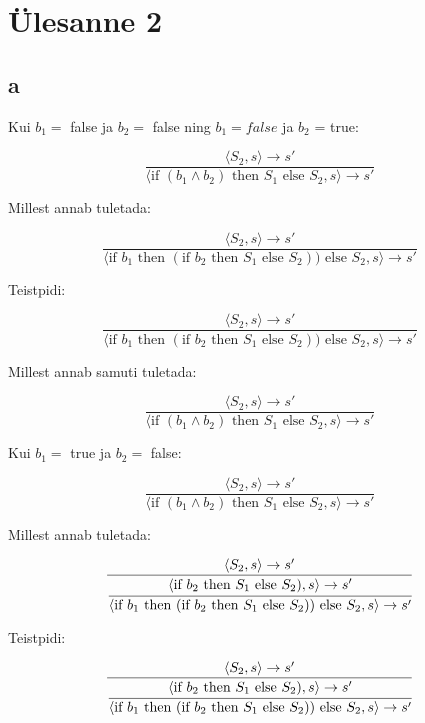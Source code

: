 \section{Ülesanne 2}

\subsection{a}

Kui \(b_1 = \) false ja \(b_2 =\) false ning \(b_1 = false\) ja \(b_2\)
= true:

\[
  \frac{
    \langle S_2, s \rangle \rightarrow s'
  }
  {
    \langle \text{if } (b_1 \wedge b_2) \text{ then } S_1 \text{ else }
    S_2, s \rangle \rightarrow s'
  }
\]

Millest annab tuletada:

\[
  \frac{
    \langle S_2, s \rangle \rightarrow s'
  }{
    \langle \text{if } b_1 \text{ then } (\text{if } b_2 \text{ then } S_1 \text{ else }
    S_2)) \text{ else } S_2, s \rangle \rightarrow s'
  }
\]

Teistpidi:

\[
  \frac{
    \langle S_2, s \rangle \rightarrow s'
  }{
    \langle \text{if } b_1 \text{ then } (\text{if } b_2 \text{ then } S_1 \text{ else }
    S_2)) \text{ else } S_2, s \rangle \rightarrow s'
  }
\]

Millest annab samuti tuletada:

\[
  \frac{
    \langle S_2, s \rangle \rightarrow s'
  }
  {
    \langle \text{if } (b_1 \wedge b_2) \text{ then } S_1 \text{ else }
    S_2, s \rangle \rightarrow s'
  }
\]


Kui \(b_1 =\) true ja \(b_2 =\) false:

\[
  \frac{
    \langle S_2, s \rangle \rightarrow s'
  }
  {
    \langle \text{if } (b_1 \wedge b_2) \text{ then } S_1 \text{ else }
    S_2, s \rangle \rightarrow s'
  }
\]

Millest annab tuletada:

\[
  \frac{
    \langle S_2, s \rangle \rightarrow s'
  }{
    \cfrac{
      \langle \text{if } b_2 \text{ then } S_1 \text{ else }
      S_2), s \rangle \rightarrow s'
    }{
      \langle \text{if } b_1 \text{ then } (\text{if } b_2 \text{ then } S_1 \text{ else }
      S_2)) \text{ else } S_2, s \rangle \rightarrow s'
    }
  }
\]

Teistpidi:

\[
  \frac{
    \langle S_2, s \rangle \rightarrow s'
  }{
    \cfrac{
      \langle \text{if } b_2 \text{ then } S_1 \text{ else }
      S_2), s \rangle \rightarrow s'
    }{
      \langle \text{if } b_1 \text{ then } (\text{if } b_2 \text{ then } S_1 \text{ else }
      S_2)) \text{ else } S_2, s \rangle \rightarrow s'
    }
  }
\]

